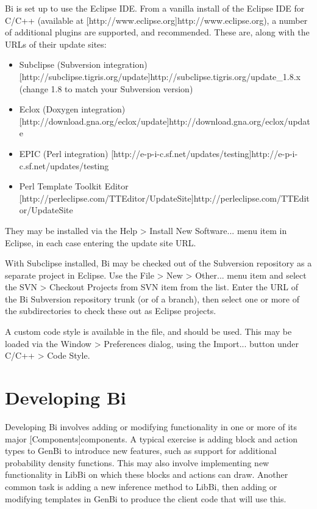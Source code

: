 Bi is set up to use the Eclipse IDE. From a vanilla install of the Eclipse IDE
for C/C++ (available at
\hyperref[hyper][http://www.eclipse.org]{http://www.eclipse.org}), a number of
additional plugins are supported, and recommended. These are, along with the
URLs of their update sites:
\begin{itemize}
\item Subclipse (Subversion integration)
  \hyperref[hyper][http://subclipse.tigris.org/update]{http://subclipse.tigris.org/update\_1.8.x}
  (change 1.8 to match your Subversion version)

\item Eclox (Doxygen integration) \hyperref[hyper][http://download.gna.org/eclox/update]{http://download.gna.org/eclox/update}

\item EPIC (Perl integration) \hyperref[hyper][http://e-p-i-c.sf.net/updates/testing]{http://e-p-i-c.sf.net/updates/testing}

\item Perl Template Toolkit Editor \hyperref[hyper][http://perleclipse.com/TTEditor/UpdateSite]{http://perleclipse.com/TTEditor/UpdateSite}
\end{itemize}
They may be installed via the \textsf{Help > Install New Software...} menu
item in Eclipse, in each case entering the update site URL.

With Subclipse installed, Bi may be checked out of the Subversion repository
as a separate project in Eclipse. Use the \textsf{File > New > Other...} menu
item and select the \textsf{SVN > Checkout Projects from SVN} item from the
list. Enter the URL of the Bi Subversion repository trunk (or of a branch),
then select one or more of the subdirectories to check these out as Eclipse
projects.

A custom code style is available in the  file,
and should be used. This may be loaded via the \textsf{Window > Preferences}
dialog, using the \textsf{Import...} button under \textsf{C/C++ > Code Style}.


\section{Developing Bi}

Developing Bi involves adding or modifying functionality in one or more of its
major \hyperref[hyper][Components]{components}. A typical exercise is adding
block and action types to GenBi to introduce new features, such as support for
additional probability density functions. This may also involve implementing
new functionality in LibBi on which these blocks and actions can draw. Another
common task is adding a new inference method to LibBi, then adding or
modifying templates in GenBi to produce the client code that will use this.

